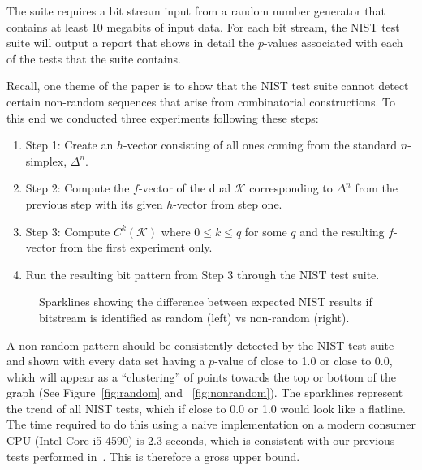 \documentclass[oneside,12pt]{amsart}
\theoremstyle{definition}
\numberwithin{equation}{section}
\begin{document}
The suite requires a bit stream input from a random number generator that contains at least 10 megabits of input data.  For each bit stream, the NIST test suite will output a report that shows in detail the $p$-values associated with each of the tests that the suite contains.

Recall, one theme of the paper is to show that the NIST test suite cannot detect certain non-random sequences that arise from combinatorial constructions.  To this end we conducted three experiments following these steps:

\begin{enumerate}
\item Step 1:  Create an $h$-vector consisting of all ones coming from the standard $n$-simplex, $\Delta^n$.
\item Step 2:  Compute the $f$-vector of the dual $\mathcal{K}$ corresponding to $\Delta^n$ from the previous step with its given $h$-vector from step one.
\item Step 3:  Compute $C^k(\mathcal{K})$ where $ 0 \leq k \leq q$ for some $q$ and the resulting $f$-vector from the first experiment only.
\item Run the resulting bit pattern from Step 3 through the NIST test suite.
\end{enumerate}

\begin{figure}[!htbp]
\centering
  \hfill
  \caption{Sparklines showing the difference between expected NIST results if bitstream is identified as random (left) vs non-random (right).}
\end{figure}


A non-random pattern should be consistently detected by the NIST test suite and shown with every data set having a $p$-value of close to 1.0 or close to 0.0, which will appear as a ``clustering'' of points towards the top or bottom of the graph (See Figure~\ref{fig:random} and ~\ref{fig:nonrandom}). The sparklines represent the trend of all NIST tests, which if close to 0.0 or 1.0 would look like a flatline. The time required to do this using a naive implementation on a modern consumer CPU (Intel Core i5-4590) is 2.3 seconds, which is consistent with our previous tests performed in~\cite{ALDH}. This is therefore a gross upper bound. %
\end{document}

